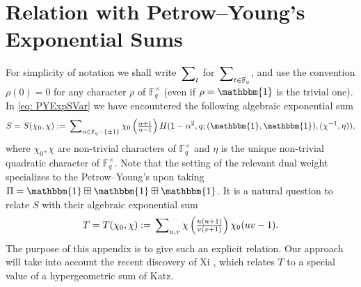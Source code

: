 \documentclass[A4]{amsart}
\numberwithin{equation}{section} \everymath{\displaystyle}
\newcommand{\id}{\mathbbm{1}}
\newcommand{\fF}{\mathbb{F}}
\begin{document}
\appendix	


\section{Relation with Petrow--Young's Exponential Sums}
	
	For simplicity of notation we shall write $\sideset{}{_t} \sum$ for $\sideset{}{_{t \in \fF_q}} \sum$, and use the convention $\rho(0)=0$ for any character $\rho$ of $\fF_q^{\times}$ (even if $\rho=\id$ is the trivial one). In \eqref{eq: PYExpSVar} we have encountered the following algebraic exponential sum
\begin{equation} \label{eq: ExpSe=1} 
	S = S(\chi_0,\chi) := \sideset{}{_{\alpha \in \fF_q - \{ \pm 1\}}} \sum \chi_0 \left( \tfrac{\alpha + 1}{\alpha - 1} \right) H(1-\alpha^2,q; (\id, \id), (\chi^{-1},\eta)), 
\end{equation}
where $\chi_0,\chi$ are non-trivial characters of $\fF_q^{\times}$ and $\eta$ is the unique non-trivial quadratic character of $\fF_q^{\times}$. Note that the setting of the relevant dual weight specializes to the Petrow--Young's \cite{PY19_CF} upon taking $\Pi = \id \boxplus \id \boxplus \id$. It is a natural question to relate $S$ with their algebraic exponential sum
\begin{equation} \label{eq: PYExpS}
	T = T(\chi_0,\chi) := \sideset{}{_{u,v}} \sum \chi \left( \tfrac{u(u+1)}{v(v+1)} \right) \chi_0(uv-1).
\end{equation}
	The purpose of this appendix is to give such an explicit relation. Our approach will take into account the recent discovery of Xi \cite{Xi23}, which relates $T$ to a special value of a hypergeometric sum of Katz.
	
\end{document}
